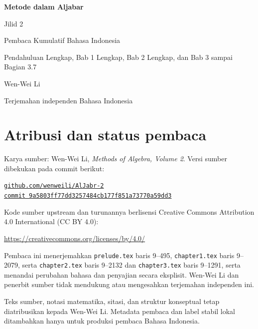 \documentclass[
  colors=true,
  fontsetup=font-setup-id.tex,
  titlesetup=titles-setup.tex
]{AJbook2}
\theoremstyle{plain}
\theoremstyle{nonumberplain}
\numberwithin{equation}{section}
\numberwithin{figure}{section}
\begin{document}
\begin{titlepage}
  \centering
  \vspace*{0.16\textheight}
  {\Huge\bfseries Metode dalam Aljabar\par}
  \vspace{0.8em}
  {\LARGE Jilid 2\par}
  \vspace{1.8em}
  {\Large Pembaca Kumulatif Bahasa Indonesia\par}
  \vspace{0.6em}
  {\large Pendahuluan Lengkap, Bab 1 Lengkap, Bab 2 Lengkap, dan Bab 3 sampai Bagian 3.7\par}
  \vfill
  {\Large Wen-Wei Li\par}
  \vspace{0.6em}
  {\normalsize Terjemahan independen Bahasa Indonesia\par}
  \vspace*{0.10\textheight}
\end{titlepage}

\cleardoublepage
\thispagestyle{empty}
\section*{Atribusi dan status pembaca}
Karya sumber: Wen-Wei Li, \emph{Methods of Algebra, Volume 2}. Versi
sumber dibekukan pada commit berikut:
\begin{center}
  \small
  \href{https://github.com/wenweili/AlJabr-2}{\texttt{github.com/wenweili/AlJabr-2}}\\
  \href{https://github.com/wenweili/AlJabr-2/commit/9a5803ff77dd3257484cb177f851a73770a59dd3}{\texttt{commit 9a5803ff77dd3257484cb177f851a73770a59dd3}}
\end{center}
Kode sumber upstream dan turunannya berlisensi Creative Commons
Attribution 4.0 International (CC BY 4.0):
\begin{center}
  \small\url{https://creativecommons.org/licenses/by/4.0/}
\end{center}
Pembaca ini menerjemahkan
\texttt{prelude.tex} baris 9--495, \texttt{chapter1.tex} baris 9--2079,
serta \texttt{chapter2.tex} baris 9--2132 dan \texttt{chapter3.tex} baris
9--1291, serta menandai perubahan bahasa dan penyajian secara eksplisit. Wen-Wei Li dan penerbit sumber tidak
mendukung atau mengesahkan terjemahan independen ini.

\medskip
Teks sumber, notasi matematika, sitasi, dan struktur konseptual tetap
diatribusikan kepada Wen-Wei Li. Metadata pembaca dan label stabil lokal
ditambahkan hanya untuk produksi pembaca Bahasa Indonesia.
\end{document}
